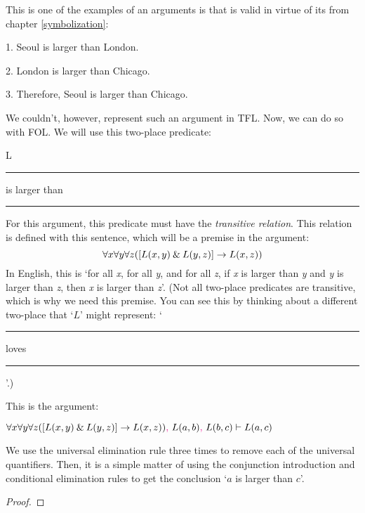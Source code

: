 \noindent This is one of the examples of an arguments is that is valid in virtue of its from chapter \ref{symbolization}:

	\begin{earg}
		\item[1.] Seoul is larger than London.
		\item[2.] London is larger than Chicago.
		\item[3.] Therefore, Seoul is larger than Chicago. 
	\end{earg}

\noindent We couldn't, however, represent such an argument in TFL. Now, we can do so with FOL. 
We will use this two-place predicate: 
\begin{ekey}
	\item[L] \rule{1cm}{0.15mm} is larger than \rule{1cm}{0.15mm}
\end{ekey}

For this argument, this predicate must have the \textit{transitive relation}. This relation is defined with this sentence, which will be a premise in the argument:
\vspace{-3mm}
$$\forall x \forall y \forall z([L(x,y) \mathbin{\&} L(y,z)] \rightarrow L(x,z))$$
In English, this is `for all \textit{x}, for all \textit{y}, and for all \textit{z}, if \textit{x} is larger than \textit{y} and \textit{y} is larger than \textit{z}, then \textit{x} is larger than \textit{z}'. 
(Not all two-place predicates are transitive, which is why we need this premise. You can see this by thinking about a different two-place that `$L$' might represent: `\rule{1cm}{0.15mm} loves \rule{1cm}{0.15mm}'.)
 
This is the argument:
\medskip

$\forall x \forall y \forall z([L(x,y) \mathbin{\&} L(y,z)] \rightarrow L(x,z))\textcolor{magenta}{,}~ L(a,b)\textcolor{magenta}{,}~ L(b,c) \vdash L(a,c)$
\medskip

\noindent We use the universal elimination rule three times to remove each of the universal quantifiers. Then, it is a simple matter of using the conjunction introduction and conditional elimination rules to get the conclusion `$a$ is larger than $c$'.

\begin{proof}
	 \pr{}
	 \pr{}
	 \pr{}
	 
	 
	 
	 
	 
\end{proof}



